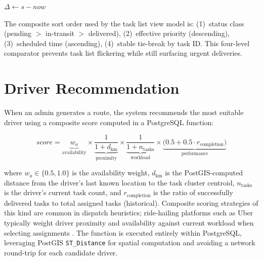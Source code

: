 \begin{algorithm}[ht]
  \caption{Dynamic Priority with Time-Urgency Bonus}\label{alg:priority}
  $\Delta \leftarrow s - \mathit{now}$\;
  \;
\end{algorithm}

The composite sort order used by the task list view model is:
(1)~status class (pending $>$ in-transit $>$ delivered),
(2)~effective priority (descending),
(3)~scheduled time (ascending),
(4)~stable tie-break by task ID.
This four-level comparator prevents task list flickering while still surfacing
urgent deliveries.

\section{Driver Recommendation}
\label{sec:driver-rec}

When an admin generates a route, the system recommends the most suitable driver
using a composite score computed in a PostgreSQL function:

\begin{equation}
  \mathit{score} =
    \underbrace{w_a}_{\text{availability}}
    \times
    \underbrace{\frac{1}{1 + d_{\text{km}}}}_{\text{proximity}}
    \times
    \underbrace{\frac{1}{1 + n_{\text{tasks}}}}_{\text{workload}}
    \times
    \underbrace{\bigl(0.5 + 0.5 \cdot r_{\text{completion}}\bigr)}_{\text{performance}}
  \label{eq:rec-score}
\end{equation}

where $w_a \in \{0.5, 1.0\}$ is the availability weight, $d_{\text{km}}$ is
the PostGIS-computed distance from the driver's last known location to the task
cluster centroid, $n_{\text{tasks}}$ is the driver's current task count, and
$r_{\text{completion}}$ is the ratio of successfully delivered tasks to total
assigned tasks (historical).  Composite scoring strategies of this kind are
common in dispatch heuristics; ride-hailing platforms such as Uber
typically weight driver proximity and availability against current workload
when selecting assignments \autocite{cachon2017surge}.  The function is
executed entirely within PostgreSQL, leveraging PostGIS
\texttt{ST\_Distance} for spatial computation and avoiding a network
round-trip for each candidate driver.

